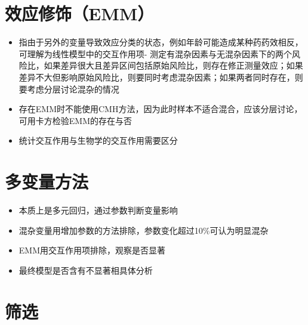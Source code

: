 \documentclass[]{book}
\providecommand{\tightlist}{%
  \setlength{\itemsep}{0pt}\setlength{\parskip}{0pt}}
\begin{document}
\hypertarget{ux6548ux5e94ux4feeux9970emm}{%
\section{效应修饰（EMM）}\label{ux6548ux5e94ux4feeux9970emm}}

\begin{itemize}
\tightlist
\item
  指由于另外的变量导致效应分类的状态，例如年龄可能造成某种药药效相反，可理解为线性模型中的交互作用项- 测定有混杂因素与无混杂因素下的两个风险比，如果差异很大且差异区间包括原始风险比，则存在修正测量效应；如果差异不大但影响原始风险比，则要同时考虑混杂因素；如果两者同时存在，则要考虑分层讨论混杂的情况
\item
  存在EMM时不能使用CMH方法，因为此时样本不适合混合，应该分层讨论，可用卡方检验EMM的存在与否
\item
  统计交互作用与生物学的交互作用需要区分
\end{itemize}

\hypertarget{ux591aux53d8ux91cfux65b9ux6cd5}{%
\section{多变量方法}\label{ux591aux53d8ux91cfux65b9ux6cd5}}

\begin{itemize}
\tightlist
\item
  本质上是多元回归，通过参数判断变量影响
\item
  混杂变量用增加参数的方法排除，参数变化超过10\%可认为明显混杂
\item
  EMM用交互作用项排除，观察是否显著
\item
  最终模型是否含有不显著相具体分析
\end{itemize}

\hypertarget{ux7b5bux9009}{%
\section{筛选}\label{ux7b5bux9009}}
\end{document}
